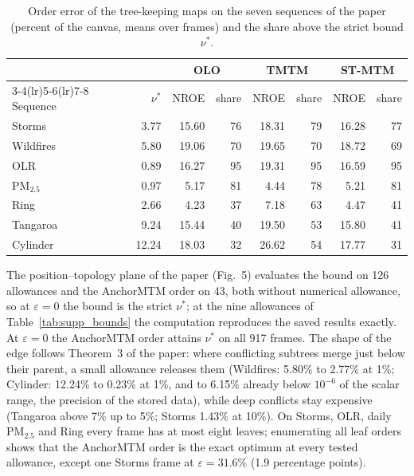 \documentclass[preprint]{vgtc}   %
\begin{document}
\begin{table}[h]
\centering\small
\caption{Order error of the tree-keeping maps on the seven sequences of the paper (percent of the canvas, means over frames) and the share above the strict bound $\nu^*$.}\label{tab:supp_forced}
\setlength{\tabcolsep}{3pt}
\begin{tabular}{lrrrrrrr}\toprule
 & & \multicolumn{2}{c}{OLO} & \multicolumn{2}{c}{TMTM} & \multicolumn{2}{c}{ST-MTM}\\\cmidrule(lr){3-4}\cmidrule(lr){5-6}\cmidrule(lr){7-8}
Sequence & $\nu^*$ & NROE & share & NROE & share & NROE & share\\\midrule
Storms & 3.77 & 15.60 & 76 & 18.31 & 79 & 16.28 & 77\\
Wildfires & 5.80 & 19.06 & 70 & 19.65 & 70 & 18.72 & 69\\
OLR & 0.89 & 16.27 & 95 & 19.31 & 95 & 16.59 & 95\\
PM$_{2.5}$ & 0.97 & 5.17 & 81 & 4.44 & 78 & 5.21 & 81\\
Ring & 2.66 & 4.23 & 37 & 7.18 & 63 & 4.47 & 41\\
Tangaroa & 9.24 & 15.44 & 40 & 19.50 & 53 & 15.80 & 41\\
Cylinder & 12.24 & 18.03 & 32 & 26.62 & 54 & 17.77 & 31\\\bottomrule
\end{tabular}
\end{table}

The position--topology plane of the paper (Fig.~5) evaluates the bound on 126 allowances and the AnchorMTM order on 43, both without numerical allowance, so at $\varepsilon=0$ the bound is the strict $\nu^*$; at the nine allowances of Table~\ref{tab:supp_bounds} the computation reproduces the saved results exactly. At $\varepsilon=0$ the AnchorMTM order attains $\nu^*$ on all 917 frames. The shape of the edge follows Theorem~3 of the paper: where conflicting subtrees merge just below their parent, a small allowance releases them (Wildfires: 5.80\% to 2.77\% at 1\%; Cylinder: 12.24\% to 0.23\% at 1\%, and to 6.15\% already below $10^{-6}$ of the scalar range, the precision of the stored data), while deep conflicts stay expensive (Tangaroa above 7\% up to 5\%; Storms 1.43\% at 10\%). On Storms, OLR, daily PM$_{2.5}$ and Ring every frame has at most eight leaves; enumerating all leaf orders shows that the AnchorMTM order is the exact optimum at every tested allowance, except one Storms frame at $\varepsilon=31.6\%$ (1.9 percentage points).
\end{document}
